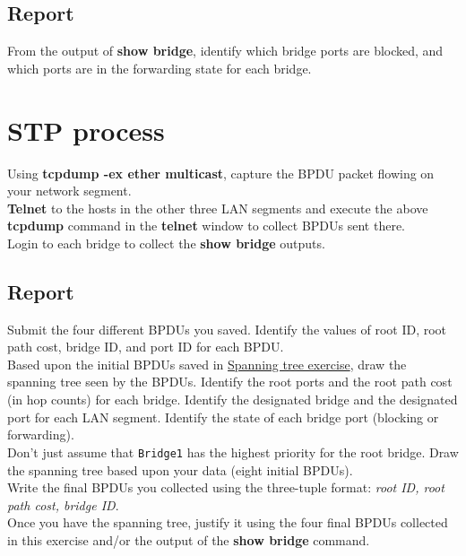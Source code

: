 \documentclass{../UTNetLab}
\begin{document}
    \subsection*{Report}
    From the output of \textbf{show bridge}, identify which bridge ports are blocked, and which ports are in the forwarding state for each bridge.

\section{STP process}
    Using \textbf{tcpdump -ex ether multicast}, capture the BPDU packet flowing on your network segment. \\
    \textbf{Telnet} to the hosts in the other three LAN segments and execute the above \textbf{tcpdump} command in the \textbf{telnet} window to collect BPDUs sent there. \\
    Login to each bridge to collect the \textbf{show bridge} outputs.
    \subsection*{Report}
    Submit the four different BPDUs you saved.
    Identify the values of root ID, root path cost, bridge ID, and port ID for each BPDU. \\
    Based upon the initial BPDUs saved in \href{sec:spanning-tree}{Spanning tree exercise}, draw the spanning tree seen by the BPDUs. Identify the root ports and the root path cost (in hop counts) for each bridge.
    Identify the designated bridge and the designated port for each LAN segment.
    Identify the state of each bridge port (blocking or forwarding). \\
    Don’t just assume that \texttt{Bridge1} has the highest priority for the root bridge.
    Draw the spanning tree based upon your data (eight initial BPDUs). \\
    Write the final BPDUs you collected using the three-tuple format: \textit{{root ID, root path cost, bridge ID}}. \\
    Once you have the spanning tree, justify it using the four final BPDUs collected in this exercise and/or the output of the \textbf{show bridge} command.
\end{document}
